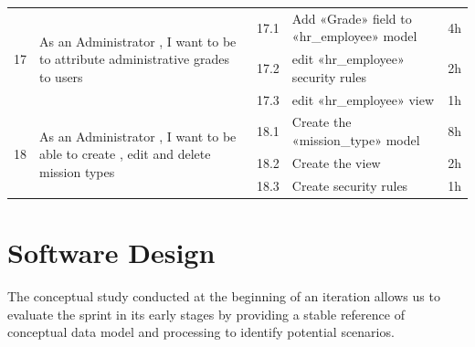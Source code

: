 \begin{center}
\begin{longtable}{|p{1cm}|p{}|p{}|p{}|p{}|}
\multirow{ 3}{*}{17}
&\multirow{3}{=}{As an Administrator , I want to be to attribute administrative grades to users}
&17.1
&Add «Grade» field to «hr\_employee» model
&4h\\\cline{3-5}
&
&17.2
&edit «hr\_employee» security rules
&2h\\\cline{3-5}
&
&17.3
&edit «hr\_employee» view
&1h\\\cline{3-5}
\hline

\multirow{ 3}{*}{18}
&\multirow{3}{=}{As an Administrator , I want to be able to create , edit and delete mission types}
&18.1
&Create the «mission\_type» model
&8h\\\cline{3-5}
&
&18.2
&Create the view
&2h\\\cline{3-5}
&
&18.3
&Create security rules
&1h\\\cline{3-5}
\hline
\end{longtable}
\end{center}
\section{Software Design}
The conceptual study conducted at the beginning of an iteration allows us to evaluate the sprint in its early stages by providing a stable reference of conceptual data model and processing to identify potential scenarios. 
